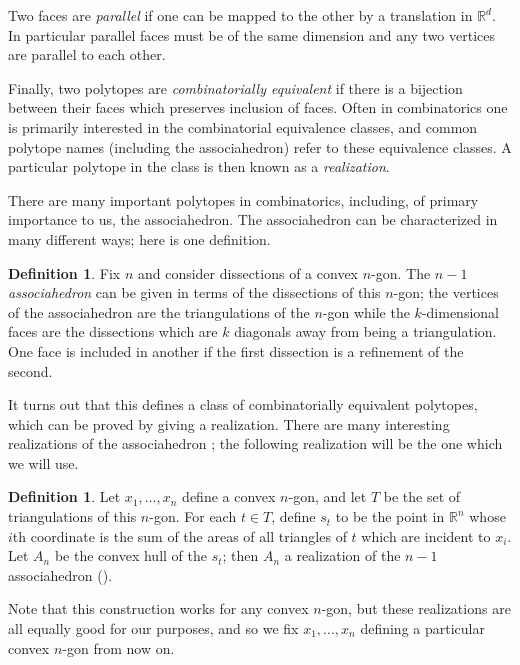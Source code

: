\documentclass[11pt]{article}
\theoremstyle{remark}
\theoremstyle{definition}
\newtheorem{dfn}[thm]{Definition}
\begin{document}
Two faces are \emph{parallel} if one can be mapped to the other by a translation in $\mathbb{R}^d$.  In particular parallel faces must be of the same dimension and any two vertices are parallel to each other.

Finally, two polytopes are \emph{combinatorially equivalent} if there is a bijection between their faces which preserves inclusion of faces.  Often in combinatorics one is primarily interested in the combinatorial equivalence classes, and common polytope names (including the associahedron) refer to these equivalence classes.  A particular polytope in the class is then known as a \emph{realization}.  

There are many important polytopes in combinatorics, including, of primary importance to us, the associahedron. The associahedron can be characterized in many different ways; here is one definition.

\begin{dfn}\label{def:associahedron}
Fix $n$ and consider dissections of a convex $n$-gon.  The $n-1$ {\em associahedron} can be given in terms of the dissections of this $n$-gon; the vertices of the associahedron are the triangulations of the $n$-gon while the $k$-dimensional faces are the dissections which are $k$ diagonals away from being a triangulation.  One face is included in another if the first dissection is a refinement of the second. 
\end{dfn}

It turns out that this defines a class of combinatorially equivalent polytopes, which can be proved by giving a realization.  There are many interesting realizations of the associahedron \cite{CSZinequivalent}; the following realization will be the one which we will use.  

\begin{dfn}\label{def:secondary polytope}
  Let $x_1, \ldots, x_n$ define a convex $n$-gon, and let $T$ be the set of triangulations of this $n$-gon.  For each $t\in T$, define $s_t$ to be the point in $\mathbb{R}^n$ whose $i$th coordinate is the sum of the areas of all triangles of $t$ which are incident to $x_i$.  Let $A_n$ be the convex hull of the $s_t$; then $A_n$ a realization of the $n-1$ associahedron (\cite[Example 9.11]{Ziegler}).
\end{dfn}
Note that this construction works for any convex $n$-gon, but these realizations are all equally good for our purposes, and so we fix $x_1, \ldots, x_n$ defining a particular convex $n$-gon from now on.
\end{document}
